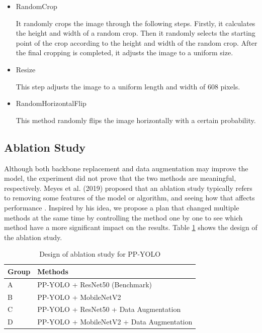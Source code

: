 \documentclass[journal,article,submit,moreauthors,pdftex]{Definitions/mdpi}
\begin{document}
\begin{itemize}
\begin{itemize}
\end{itemize}


\begin{itemize}
\item{RandomCrop}

 It randomly crops the image through the following steps. Firstly, it calculates the height and width of a random crop. Then it randomly selects the starting point of the crop according to the height and width of the random crop. After the final cropping is completed, it adjusts the image to a uniform size.

\end{itemize}


\begin{itemize}
\item{Resize}

This step adjusts the image to a uniform length and width of 608 pixels.

\end{itemize}


\begin{itemize}
\item{RandomHorizontalFlip}

This method randomly flips the image horizontally with a certain probability.

\end{itemize}
\end{itemize}


\subsection{Ablation Study}
Although both backbone replacement and data augmentation may improve the model, the experiment did not prove that the two methods are meaningful, respectively. Meyes et al. (2019) proposed that an ablation study typically refers to removing some features of the model or algorithm, and seeing how that affects performance \cite{meyes2019ablation}.
Inspired by his idea, we propose a plan that changed multiple methods at the same time by controlling the method one by one to see which method have a more significant impact on the results. Table \ref{tbl:design of ablation study for PP-YOLO} shows the design of the ablation study.

\begin{table}[htbp]
\centering
\caption{Design of ablation study for PP-YOLO}
\begin{tabular}{ll} 
\toprule
\textbf{Group}&\textbf{Methods}\\
\midrule
A& PP-YOLO + ResNet50 (Benchmark) \\
\cmidrule(r){1-2}
B& PP-YOLO + MobileNetV2 \\
C& PP-YOLO + ResNet50 + Data Augmentation \\
D& PP-YOLO + MobileNetV2 + Data Augmentation\\
\bottomrule
\end{tabular}
\label{tbl:design of ablation study for PP-YOLO}
\end{table}
\end{document}
